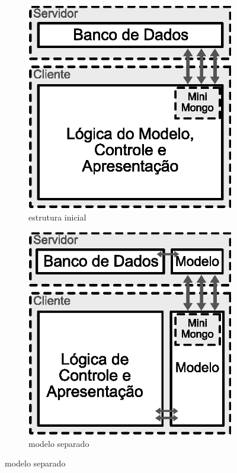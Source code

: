 \begin{figure}[h!]
	\centering
	\begin{subfigure}{.34\textwidth}
  		\centering
  		\includegraphics[width=.9\linewidth]{figuras/arquitetura1.eps}
  		\caption{estrutura inicial}
  		\label{fig:subarq1}
	\end{subfigure}%
 	 \begin{subfigure}{.34\textwidth}
  		\centering
  		\includegraphics[width=.9\linewidth]{figuras/arquitetura2.eps}
  		\caption{modelo separado}
  		\label{fig:subarq2}
	\end{subfigure}%


\end{figure}
